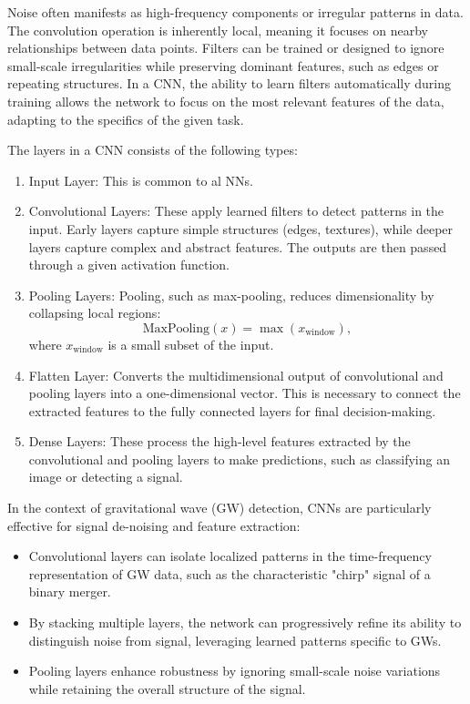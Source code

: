 \documentclass[%
reprint,
amsmath,amssymb,
aps,
]{revtex4-2}
\begin{document}
Noise often manifests as high-frequency components or irregular patterns in data. The convolution operation is inherently local, meaning it focuses on nearby relationships between data points. Filters can be trained or designed to ignore small-scale irregularities while preserving dominant features, such as edges or repeating structures. In a CNN, the ability to learn filters automatically during training allows the network to focus on the most relevant features of the data, adapting to the specifics of the given task.

The layers in a CNN consists of the following types:
\begin{enumerate}
	\item Input Layer: This is common to al NNs.
	\item Convolutional Layers: These apply learned filters to detect patterns in the input. Early layers capture simple structures (edges, textures), while deeper layers capture complex and abstract features. The outputs are then passed through a given activation function.
	\item Pooling Layers: Pooling, such as max-pooling, reduces dimensionality by collapsing local regions:
	\[\text{MaxPooling}(x)=\max(x_{\text{window}}),\]
	where \( x_{\text{window}} \) is a small subset of the input.
	\item Flatten Layer: Converts the multidimensional output of convolutional and pooling layers into a one-dimensional vector. This is necessary to connect the extracted features to the fully connected layers for final decision-making.
	\item Dense Layers: These process the high-level features extracted by the convolutional and pooling layers to make predictions, such as classifying an image or detecting a signal.
\end{enumerate}

In the context of gravitational wave (GW) detection, CNNs are particularly effective for signal de-noising and feature extraction:
\begin{itemize}
	\item Convolutional layers can isolate localized patterns in the time-frequency representation of GW data, such as the characteristic "chirp" signal of a binary merger.
	\item By stacking multiple layers, the network can progressively refine its ability to distinguish noise from signal, leveraging learned patterns specific to GWs.
	\item Pooling layers enhance robustness by ignoring small-scale noise variations while retaining the overall structure of the signal.
\end{itemize}
\end{document}
